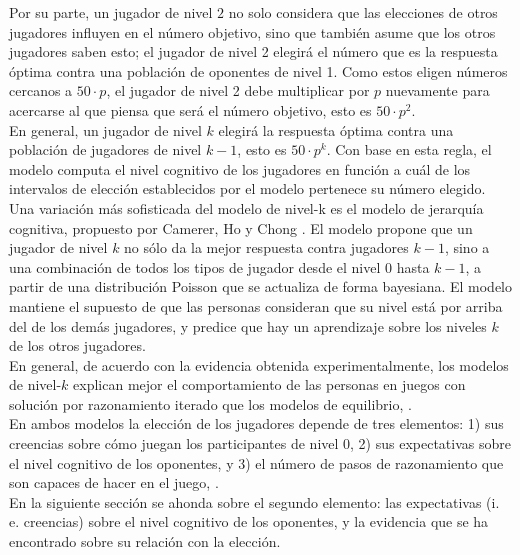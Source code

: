 Por su parte, un jugador de nivel $2$ no solo considera que las elecciones de otros jugadores influyen en el número objetivo, sino que también asume que los otros jugadores saben esto; el jugador de nivel 2 elegirá el número que es la respuesta óptima contra una población de oponentes de nivel 1. Como estos eligen números cercanos a $50 \cdot p$, el jugador de nivel 2 debe multiplicar por $p$ nuevamente para acercarse al que piensa que será el número objetivo, esto es $50 \cdot p^2$.\\

En general, un jugador de nivel $k$ elegirá la respuesta óptima contra una población de jugadores de nivel $k-1$, esto es $50 \cdot p^k$. Con base en esta regla, el modelo  computa el nivel cognitivo de los jugadores en función a cuál de los intervalos de elección establecidos por el modelo pertenece su número elegido.\\

Una variación más sofisticada del modelo de nivel-k es el modelo de jerarquía cognitiva, propuesto por Camerer, Ho y Chong \parencite*{Camerer2004}. El modelo propone que un jugador de nivel $k$ no sólo da la mejor respuesta contra jugadores $k-1$, sino a una combinación de todos los tipos de jugador desde el nivel 0 hasta $k-1$, a partir de una distribución Poisson que se actualiza de forma bayesiana. El modelo mantiene el supuesto de que las personas consideran que su nivel está por arriba del de los demás jugadores, y predice que hay un aprendizaje sobre los niveles $k$ de los otros jugadores.\\

En general, de acuerdo con la evidencia obtenida experimentalmente, los modelos de nivel-$k$ explican mejor el comportamiento de las personas en juegos con solución por razonamiento iterado que los modelos de equilibrio, \parencite{Crawford2013}.\\

En ambos modelos la elección de los jugadores depende de tres elementos: 1) sus creencias sobre cómo juegan los participantes de nivel 0, 2) sus expectativas sobre el nivel cognitivo de los oponentes, y 3) el número de pasos de razonamiento que son capaces de hacer en el juego, \parencite{Agranov2012}.\\

En la siguiente sección se ahonda sobre el segundo elemento: las expectativas (i. e. creencias) sobre el nivel cognitivo de los oponentes, y la evidencia que se ha encontrado sobre su relación con la elección.\\

